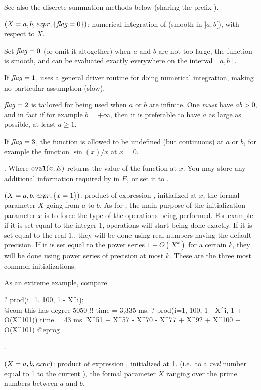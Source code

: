 See also the discrete summation methods below (sharing the prefix ).

$(X=a,b,\hbox{\it expr\/},\{\hbox{\it f\kern0pt lag\/}=0\})$: numerical integration of
 (smooth in $]a,b[$), with respect to $X$.

Set $\hbox{\it f\kern0pt lag\/}=0$ (or omit it altogether) when $a$ and $b$ are not too large, the
function is smooth, and can be evaluated exactly everywhere on the interval
$[a,b]$.

If $\hbox{\it f\kern0pt lag\/}=1$, uses a general driver routine for doing numerical integration,
making no particular assumption (slow).

$\hbox{\it f\kern0pt lag\/}=2$ is tailored for being used when $a$ or $b$ are infinite. One
\emph{must} have $ab>0$, and in fact if for example $b=+\infty$, then it is
preferable to have $a$ as large as possible, at least $a\ge1$.

If $\hbox{\it f\kern0pt lag\/}=3$, the function is allowed to be undefined (but continuous) at $a$
or $b$, for example the function $\sin(x)/x$ at $x=0$.

. Where ${\tt eval}(x, E)$ returns the value of the function at $x$. You
may store any additional information required by  in $E$, or set it
to .

$(X=a,b,\hbox{\it expr\/},\{x=1\})$: product of expression
, initialized at $x$, the formal parameter $X$ going from $a$ to
$b$. As for , the main purpose of the initialization parameter $x$
is to force the type of the operations being performed. For example if it is
set equal to the integer 1, operations will start being done exactly. If it
is set equal to the real $1.$, they will be done using real numbers having
the default precision. If it is set equal to the power series $1+O(X^k)$ for
a certain $k$, they will be done using power series of precision at most $k$.
These are the three most common initializations.

\noindent As an extreme example, compare

\bprog
? prod(i=1, 100, 1 - X^i);  \\@com this has degree $5050$ !!
time = 3,335 ms.
? prod(i=1, 100, 1 - X^i, 1 + O(X^101))
time = 43 ms.
  X^51 + X^57 - X^70 - X^77 + X^92 + X^100 + O(X^101)
@eprog

.

$(X=a,b,\hbox{\it expr\/})$: product of expression ,
initialized at 1. (i.e.~to a \emph{real} number equal to 1 to the current
), the formal parameter $X$ ranging over the prime numbers
between $a$ and $b$.

